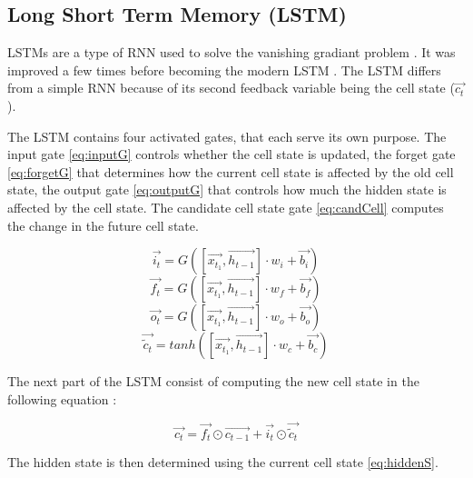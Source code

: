 \subsection{Long Short Term Memory (LSTM)}

LSTMs are a type of RNN used to solve the vanishing gradiant problem \cite{firstLSTM}. It was improved a few times before becoming the modern LSTM \cite{improvLSTM}. The LSTM differs from a simple RNN because of its second feedback variable being the cell state ($\overrightarrow{c_t}$).

The LSTM contains four activated gates, that each serve its own purpose. The input gate \cref{eq:inputG} controls whether the cell state is updated, the forget gate \cref{eq:forgetG} that determines how the current cell state is affected by the old cell state, the output gate \cref{eq:outputG} that controls how much the hidden state is affected by the cell state. The candidate cell state gate \cref{eq:candCell} computes the change in the future cell state.

\begin{equation}\label{eq:inputG}
  \overrightarrow{i_t}= G ([\overrightarrow{x_{t_1}},\overrightarrow{h_{t-1}}]\cdot w_i + \overrightarrow{b_i})
\end{equation}
\begin{equation}\label{eq:forgetG}
  \overrightarrow{f_t}= G ([\overrightarrow{x_{t_1}},\overrightarrow{h_{t-1}}]\cdot w_f + \overrightarrow{b_f})
\end{equation}
\begin{equation}\label{eq:outputG}
  \overrightarrow{o_t}= G ([\overrightarrow{x_{t_1}},\overrightarrow{h_{t-1}}]\cdot w_o + \overrightarrow{b_o})
\end{equation}
\begin{equation}\label{eq:candCell}
  \overrightarrow{\tilde{c}_t}=tanh([\overrightarrow{x_{t_1}},\overrightarrow{h_{t-1}}]\cdot w_c+ \overrightarrow{b_c})
\end{equation}

The next part of the LSTM consist of computing the new cell state in the following equation :

\begin{equation}\label{eq:cellS}
  \overrightarrow{c_t}=\overrightarrow{f_t}\odot \overrightarrow{c_{t-1}} + \overrightarrow{i_t} \odot \overrightarrow{\tilde{c}_t}
\end{equation}

The hidden state is then determined using the current cell state \cref{eq:hiddenS}.

